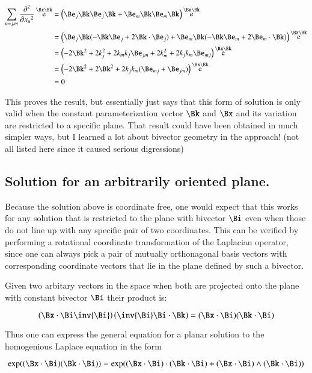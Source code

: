 \documentclass{article}      %
\newcommand{\dsqxj}[2] {\frac {\partial^2 {#1}} {\partial {x_{#2}}^2}}
\DeclareMathOperator{\Exp}{e}
\begin{document}
\begin{align*}
\sum_{u=j,m}\dsqxj{}{u}\Exp^{\Bx\Bk}
&= \left( \Be_j\Bk \Be_j\Bk + \Be_m\Bk \Be_m\Bk \right) \Exp^{\Bx\Bk} \\
&= \left( \Be_j\Bk (-\Bk\Be_j + 2 \Bk \cdot \Be_j) + \Be_m\Bk (-\Bk\Be_m + 2 \Be_m \cdot \Bk) \right) \Exp^{\Bx\Bk} \\
&= \left( -2\Bk^2 + 2 k_j^2 + 2 k_m k_j \Be_{jm} + 2 k_m^2 + 2 k_j k_m \Be_{mj} \right) \Exp^{\Bx\Bk} \\
&= \left( -2\Bk^2 + 2 \Bk^2 + 2 k_j k_m (\Be_{mj} + \Be_{jm}) \right) \Exp^{\Bx\Bk} \\
&= 0 \\
\end{align*}

This proves the result, but essentially just says that this form of
solution is only
valid when the constant parameterization vector $\Bk$ and $\Bx$ and its 
variation are restricted to a specific plane.  That result could have
been obtained in much simpler ways, but I learned a lot about bivector
geometry in the approach! (not all listed here since it caused serious
digressions)

\subsection{ Solution for an arbitrarily oriented plane. }

Because the solution above is coordinate free, one would expect that this
works for any solution that is restricted to the plane with bivector $\Bi$
even when those do not line up with any specific pair of two coordinates.
This can be verified by performing a rotational 
coordinate transformation of the 
Laplacian operator, since one can always pick a pair of mutually orthonagonal
basis vectors with corresponding coordinate vectors that lie in the plane
defined by such a bivector.

Given two arbitary vectors in the space when both are projected onto the plane
with constant bivector $\Bi$ their product is:

\[
\left(\Bx \cdot \Bi \inv{\Bi}\right)\left(\inv{\Bi} \Bi \cdot \Bk\right)
=
(\Bx \cdot \Bi)(\Bk \cdot \Bi)
\]

Thus one can express the general equation for a planar solution to the
homogenious Laplace equation in the form

\begin{equation}
\exp((\Bx \cdot \Bi)(\Bk \cdot \Bi))
=
\exp((\Bx \cdot \Bi) \cdot (\Bk \cdot \Bi) +
     (\Bx \cdot \Bi) \wedge (\Bk \cdot \Bi) )
\end{equation}
\end{document}
